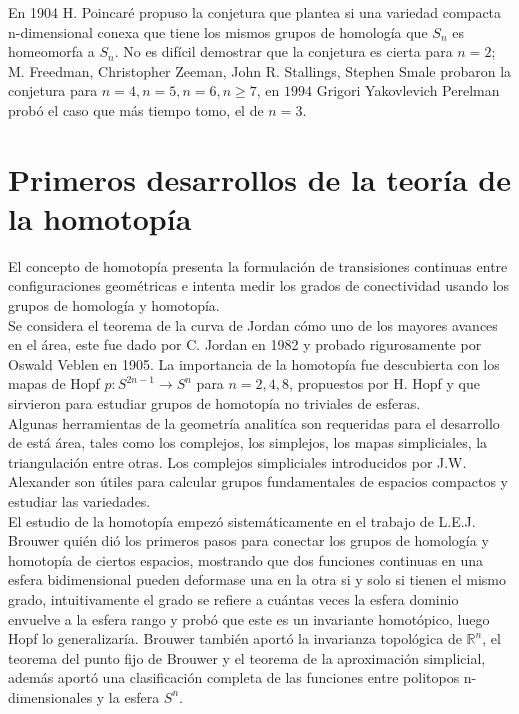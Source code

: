 \documentclass[12pt,letterpaper]{article}
\begin{document}
En 1904 H. Poincaré propuso la conjetura que plantea si una variedad compacta n-dimensional conexa que tiene los mismos
grupos de homología que $S_n$ es homeomorfa a $S_n$. No es difícil demostrar que la conjetura es cierta para $n = 2$; M. Freedman, Christopher Zeeman, John R. Stallings, Stephen Smale probaron la conjetura para $n=4, n=5, n=6, n\geq 7$, en $1994$ Grigori Yakovlevich Perelman probó el caso que más tiempo tomo, el de $n=3$. 

\section*{Primeros desarrollos de la teoría de la homotopía}
El concepto de homotopía presenta la formulación de transisiones continuas entre configuraciones geométricas e intenta medir los grados de conectividad usando los grupos de homología y homotopía. \\

Se considera el teorema de la curva de Jordan cómo uno de los mayores avances en el área, este fue dado por C. Jordan en 1982 y probado rigurosamente por Oswald Veblen en 1905. La importancia de la homotopía fue descubierta con los mapas de Hopf $p:S^{2n-1}\rightarrow S^n$ para $n=2,4,8$, propuestos por H. Hopf y que sirvieron para estudiar grupos de homotopía no triviales de esferas.\\

Algunas herramientas de la geometría analitíca son requeridas para el desarrollo de está área, tales como los complejos, los simplejos, los mapas simpliciales, la triangulación entre otras. Los complejos simpliciales introducidos por J.W. Alexander son útiles para calcular grupos fundamentales de espacios compactos y estudiar las variedades. \\

El estudio de la homotopía empezó sistemáticamente en el trabajo de L.E.J. Brouwer quién dió los primeros pasos para conectar los grupos de homología y homotopía de ciertos espacios, mostrando que dos funciones continuas en una esfera bidimensional pueden deformase una en la otra si y solo si tienen el mismo grado, intuitivamente el grado se refiere a cuántas veces la esfera dominio envuelve a la esfera rango y probó que este es un invariante homotópico, luego Hopf lo generalizaría. Brouwer también aportó la invarianza topológica de $\mathbb{R}^n$, el teorema del punto fijo de Brouwer y el teorema de la aproximación simplicial, además aportó una clasificación completa de las funciones entre politopos n-dimensionales y la esfera $S^n$. \\ 
\end{document}
